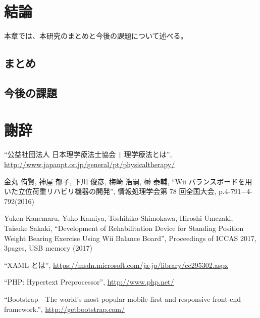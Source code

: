 \documentclass[uplatex,a4paper,12pt]{jsreport}
\begin{document}

\chapter{結論}\label{chap:keturon}
本章では、本研究のまとめと今後の課題について述べる。

\section{まとめ}\label{sec:matome}
 
\section{今後の課題}\label{sec:kadai}


\chapter*{謝辞}



\begin{thebibliography}{99}%

   ``公益社団法人 日本理学療法士協会 \verb+|+ 理学療法とは'',
  \url{http://www.japanpt.or.jp/general/pt/physicaltherapy/}
    
   金丸 侑賢, 神屋 郁子, 下川 俊彦, 梅崎 浩嗣, 榊 泰輔,
  ``Wii バランスボードを用いた立位荷重リハビリ機器の開発'', 
  情報処理学会第 78 回全国大会, p.4-791$−$4-792(2016)         

   Yuken Kanemaru, Yuko Kamiya, Toshihiko Shimokawa, Hiroshi Umezaki, Taisuke Sakaki, 
  ``Development of Rehabilitation Device for Standing Position Weight Bearing Exercise Using Wii Balance Board'',
  Proceedings of ICCAS 2017, 3pages, USB memory (2017)    

   ``XAML とは'',
  \url{https://msdn.microsoft.com/ja-jp/library/cc295302.aspx}

   ``PHP: Hypertext Preprocessor'',
  \url{http://www.php.net/}

   ``Bootstrap - The world's most popular mobile-first and responsive front-end framework.'',      
  \url{http://getbootstrap.com/}

\end{thebibliography}
\appendix
\end{document}
